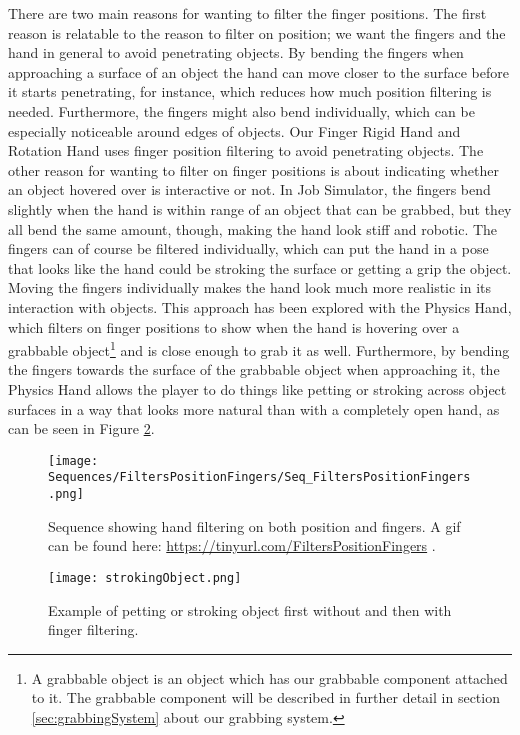 There are two main reasons for wanting to filter the finger positions. The first reason is relatable to the reason to filter on position; we want the fingers and the hand in general to avoid penetrating objects. By bending the fingers when approaching a surface of an object the hand can move closer to the surface before it starts penetrating, for instance, which reduces how much position filtering is needed. Furthermore, the fingers might also bend individually, which can be especially noticeable around edges of objects. Our Finger Rigid Hand and Rotation Hand uses finger position filtering to avoid penetrating objects. The other reason for wanting to filter on finger positions is about indicating whether an object hovered over is interactive or not. In Job Simulator, the fingers bend slightly when the hand is within range of an object that can be grabbed, but they all bend the same amount, though, making the hand look stiff and robotic. The fingers can of course be filtered individually, which can put the hand in a pose that looks like the hand could be stroking the surface or getting a grip the object. Moving the fingers individually makes the hand look much more realistic in its interaction with objects. This approach has been explored with the Physics Hand, which filters on finger positions to show when the hand is hovering over a grabbable object\footnote{A grabbable object is an object which has our grabbable component attached to it. The grabbable component will be described in further detail in section \ref{sec:grabbingSystem} about our grabbing system.} and is close enough to grab it as well. Furthermore, by bending the fingers towards the surface of the grabbable object when approaching it, the Physics Hand allows the player to do things like petting or stroking across object surfaces in a way that looks more natural than with a completely open hand, as can be seen in Figure \ref{fig:strokingFingerExample}.

\begin{figure}[H]
\centering
\texttt{[image: Sequences/FiltersPositionFingers/Seq\_FiltersPositionFingers.png]}
\caption{Sequence showing hand filtering on both position and fingers. A gif can be found here: \url{https://tinyurl.com/FiltersPositionFingers} .}
\label{fig:filtersPositionFingers}
\end{figure}

\begin{figure}[H]
\centering
\texttt{[image: strokingObject.png]}
\caption{Example of petting or stroking object first without and then with finger filtering.}
\label{fig:strokingFingerExample}
\end{figure}

